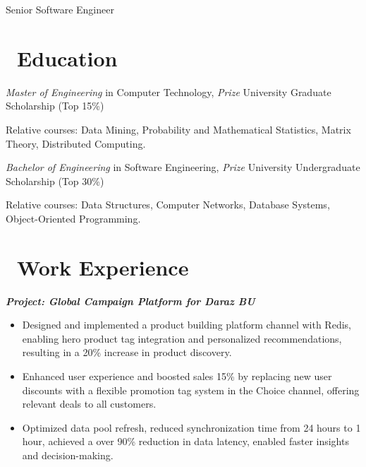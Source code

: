 \documentclass{resume}
\begin{document}

 \centerline{Senior Software Engineer}
\vspace{1ex}
 \vspace{-2ex}
 
\section{\faGraduationCap\ Education}
  \textit{Master of Engineering} in Computer Technology, \textit{ Prize} University Graduate Scholarship (Top 15\%)
 
 Relative courses: Data Mining, Probability and Mathematical Statistics, Matrix Theory, Distributed Computing.

\vspace{1ex}
 \textit{Bachelor of Engineering} in Software Engineering, \textit{ Prize} University Undergraduate Scholarship (Top 30\%)

Relative courses: Data Structures, Computer Networks, Database Systems, Object-Oriented Programming.

\section{\faUsers\ Work Experience}


\setlength{\parindent}{1em}

\textit{\textbf{\hspace{1em}Project: Global Campaign Platform for Daraz BU}}
\begin{itemize}
  \item Designed and implemented a product building platform channel with Redis, enabling hero product tag integration and personalized recommendations, resulting in a 20\% increase in product discovery.
    \item Enhanced user experience and boosted sales 15\% by replacing new user discounts with a flexible promotion tag system in the Choice channel, offering relevant deals to all customers.
    \item Optimized data pool refresh, reduced synchronization time from 24 hours to 1 hour, achieved a over 90\% reduction in data latency, enabled faster insights and decision-making.
    
\end{itemize}
\end{document}
